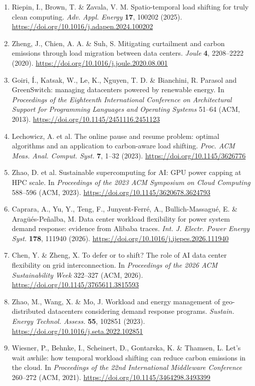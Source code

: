 \documentclass[10pt,a4paper]{article}
\begin{document}
{\begin{enumerate}[label=\arabic*.,leftmargin=*,itemsep=2.5pt]
\item Riepin, I., Brown, T. \& Zavala, V. M. Spatio-temporal load shifting for truly clean computing. \emph{Adv. Appl. Energy} \textbf{17}, 100202 (2025). \url{https://doi.org/10.1016/j.adapen.2024.100202}
\item Zheng, J., Chien, A. A. \& Suh, S. Mitigating curtailment and carbon emissions through load migration between data centers. \emph{Joule} \textbf{4}, 2208–2222 (2020). \url{https://doi.org/10.1016/j.joule.2020.08.001}
\item Goiri, Í., Katsak, W., Le, K., Nguyen, T. D. \& Bianchini, R. Parasol and GreenSwitch: managing datacenters powered by renewable energy. In \emph{Proceedings of the Eighteenth International Conference on Architectural Support for Programming Languages and Operating Systems} 51–64 (ACM, 2013). \url{https://doi.org/10.1145/2451116.2451123}
\item Lechowicz, A. et al. The online pause and resume problem: optimal algorithms and an application to carbon-aware load shifting. \emph{Proc. ACM Meas. Anal. Comput. Syst.} \textbf{7}, 1–32 (2023). \url{https://doi.org/10.1145/3626776}
\item Zhao, D. et al. Sustainable supercomputing for AI: GPU power capping at HPC scale. In \emph{Proceedings of the 2023 ACM Symposium on Cloud Computing} 588–596 (ACM, 2023). \url{https://doi.org/10.1145/3620678.3624793}
\item Caprara, A., Yu, Y., Teng, F., Junyent-Ferré, A., Bullich-Massagué, E. \& Aragüés-Peñalba, M. Data center workload flexibility for power system demand response: evidence from Alibaba traces. \emph{Int. J. Electr. Power Energy Syst.} \textbf{178}, 111940 (2026). \url{https://doi.org/10.1016/j.ijepes.2026.111940}
\item Chen, Y. \& Zheng, X. To defer or to shift? The role of AI data center flexibility on grid interconnection. In \emph{Proceedings of the 2026 ACM Sustainability Week} 322–327 (ACM, 2026). \url{https://doi.org/10.1145/3765611.3815593}
\item Zhao, M., Wang, X. \& Mo, J. Workload and energy management of geo-distributed datacenters considering demand response programs. \emph{Sustain. Energy Technol. Assess.} \textbf{55}, 102851 (2023). \url{https://doi.org/10.1016/j.seta.2022.102851}
\item Wiesner, P., Behnke, I., Scheinert, D., Gontarska, K. \& Thamsen, L. Let's wait awhile: how temporal workload shifting can reduce carbon emissions in the cloud. In \emph{Proceedings of the 22nd International Middleware Conference} 260–272 (ACM, 2021). \url{https://doi.org/10.1145/3464298.3493399}

\end{enumerate}}
\end{document}
